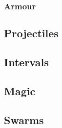 \begin{multicols}{2}
\subsubsection*{Armour}



\commonArmourChart

\mentalSkillChart

\subsection*{Projectiles}



\subsection*{Intervals}



\subsection*{Magic}



\subsection*{Swarms}



\end{multicols}

